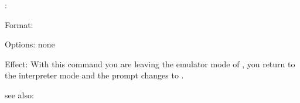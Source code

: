 :

Format: 
  
Options: none

Effect: With this command you are leaving the emulator mode of \FORWARD{}, you return
	to the interpreter mode and the prompt changes to .

see also:  

